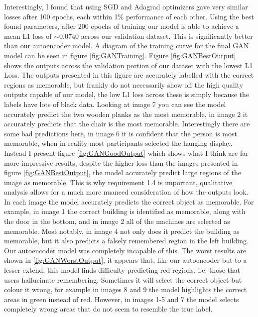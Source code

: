\documentclass{UoYCSproject}
\begin{document}
Interestingly, I found that using SGD and Adagrad optimizers gave very similar losses after 100 epochs, each within 1\% performance of each other.
Using the best found parameters, after 200 epochs of training our model is able to achieve a mean L1 loss of \( \sim 0.0740 \) across our validation dataset. This is significantly better than our autoencoder model. A diagram of the training curve for the final GAN model can be seen in figure \ref{fig:GANTraining}. 
Figure \ref{fig:GANBestOutput} shows the outputs across the validation portion of our dataset with the lowest L1 Loss. The outputs presented in this figure are accurately labelled with the correct regions as memorable, but frankly do not necessarily show off the high quality outputs capable of our model, the low L1 loss across these is simply because the labels have lots of black data. 
Looking at image 7 you can see the model accurately predict the two wooden planks as the most memorable, in image 2 it accurately predicts that the chair is the most memorable. Interestingly there are some bad predictions here, in image 6 it is confident that the person is most memorable, when in reality most participants selected the hanging display. 
Instead I present figure \ref{fig:GANGoodOutput} which shows what I think are far more impressive results, despite the higher loss than the images presented in figure \ref{fig:GANBestOutput}, the model  accurately predict large regions of the image as memorable. This is why requirement 1.4 is important, qualitative analysis allows for a much more nuanced consideration of how the outputs look.
In each image the model accurately predicts the correct object as memorable. For example, in image 1 the correct building is identified as memorable, along with the door in the bottom, and in image 2 all of the machines are selected as memorable. Most notably, in image 4 not only does it predict the building as memorable, but it also predicts a falsely remembered region in the left building. Our autoencoder model was completely incapable of this. 
The worst results are shown in \ref{fig:GANWorstOutput}, it appears that, like our autoencoder but to a lesser extend, this model finds difficulty predicting red regions, i.e. those that users hallucinate remembering. Sometimes it will select the correct object but colour it wrong, for example in images 8 and 9 the model highlights the correct areas in green instead of red. However, in images 1-5 and 7 the model selects completely wrong areas that do not seem to resemble the true label.
\end{document}
